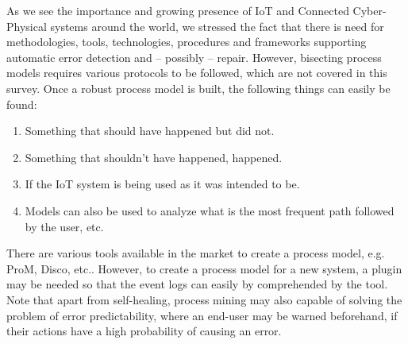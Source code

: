 As we see the importance and growing presence of IoT and Connected Cyber-Physical systems around the world, we stressed the fact that there is need for methodologies, tools, technologies, procedures and frameworks supporting automatic error detection and – possibly – repair.  However, bisecting process models requires various protocols to be followed\cite{Aalst2015}, which are not covered in this survey. Once a robust process model is built, the following things can easily be found:

\begin{enumerate}
	\item Something that should have happened but did not.
	\item Something that shouldn’t have happened, happened.
	\item If the IoT system is being used as it was intended to be.
	\item Models can also be used to analyze what is the most frequent path followed by the user, etc.
\end{enumerate}

There are various tools available in the market to create a process model, e.g. ProM, Disco, etc.. However, to create a process model for a new system, a plugin may be needed so that the event logs can easily by comprehended by the tool. Note that apart from self-healing, process mining may also capable of solving the problem of error predictability, where an end-user may be warned beforehand, if their actions have a high probability of causing an error.
